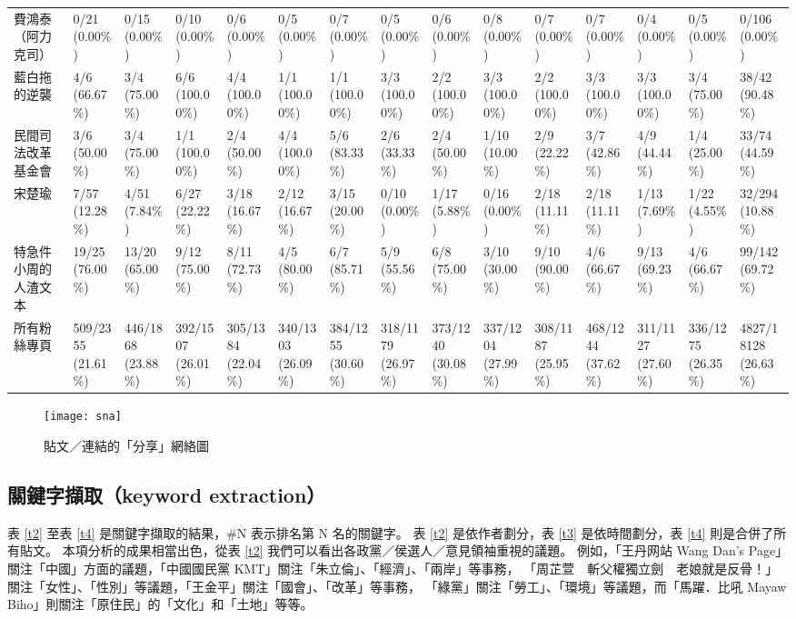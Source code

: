 \documentclass[letterpaper, 10pt, conference]{ieeeconf}   %
\begin{document}
\begin{CJK}{UTF8}{bsmi}
\begin{landscape}
\begin{longtable}[c]{@{}L{2.45cm}L{1.1cm}L{1.1cm}L{1.1cm}L{1.1cm}L{1.1cm}L{1.1cm}L{1.1cm}L{1.1cm}L{1.1cm}L{1.1cm}L{1.1cm}L{1.1cm}L{1.1cm}L{1.1cm}@{}}
費鴻泰（阿力克司） & 0/21 (0.00\%) & 0/15 (0.00\%) & 0/10 (0.00\%) & 0/6 (0.00\%) & 0/5 (0.00\%) & 0/7 (0.00\%) & 0/5 (0.00\%) & 0/6 (0.00\%) & 0/8 (0.00\%) & 0/7 (0.00\%) & 0/7 (0.00\%) & 0/4 (0.00\%) & 0/5 (0.00\%) & 0/106 (0.00\%) \\
藍白拖的逆襲 & 4/6 (66.67\%) & 3/4 (75.00\%) & 6/6 (100.00\%) & 4/4 (100.00\%) & 1/1 (100.00\%) & 1/1 (100.00\%) & 3/3 (100.00\%) & 2/2 (100.00\%) & 3/3 (100.00\%) & 2/2 (100.00\%) & 3/3 (100.00\%) & 3/3 (100.00\%) & 3/4 (75.00\%) & 38/42 (90.48\%) \\
民間司法改革基金會 & 3/6 (50.00\%) & 3/4 (75.00\%) & 1/1 (100.00\%) & 2/4 (50.00\%) & 4/4 (100.00\%) & 5/6 (83.33\%) & 2/6 (33.33\%) & 2/4 (50.00\%) & 1/10 (10.00\%) & 2/9 (22.22\%) & 3/7 (42.86\%) & 4/9 (44.44\%) & 1/4 (25.00\%) & 33/74 (44.59\%) \\
宋楚瑜 & 7/57 (12.28\%) & 4/51 (7.84\%) & 6/27 (22.22\%) & 3/18 (16.67\%) & 2/12 (16.67\%) & 3/15 (20.00\%) & 0/10 (0.00\%) & 1/17 (5.88\%) & 0/16 (0.00\%) & 2/18 (11.11\%) & 2/18 (11.11\%) & 1/13 (7.69\%) & 1/22 (4.55\%) & 32/294 (10.88\%) \\
特急件小周的人渣文本 & 19/25 (76.00\%) & 13/20 (65.00\%) & 9/12 (75.00\%) & 8/11 (72.73\%) & 4/5 (80.00\%) & 6/7 (85.71\%) & 5/9 (55.56\%) & 6/8 (75.00\%) & 3/10 (30.00\%) & 9/10 (90.00\%) & 4/6 (66.67\%) & 9/13 (69.23\%) & 4/6 (66.67\%) & 99/142 (69.72\%) \\
所有粉絲專頁 & 509/2355 (21.61\%) & 446/1868 (23.88\%) & 392/1507 (26.01\%) & 305/1384 (22.04\%) & 340/1303 (26.09\%) & 384/1255 (30.60\%) & 318/1179 (26.97\%) & 373/1240 (30.08\%) & 337/1204 (27.99\%) & 308/1187 (25.95\%) & 468/1244 (37.62\%) & 311/1127 (27.60\%) & 336/1275 (26.35\%) & 4827/18128 (26.63\%) \\* \bottomrule
\end{longtable}
\end{landscape}

\begin{figure}[!htbp]
\centering
\texttt{[image: sna]}
\caption{貼文／連結的「分享」網絡圖}
\label{f4}
\end{figure}

\twocolumn

\subsection*{關鍵字擷取（keyword extraction）}

表 \ref{t2} 至表 \ref{t4} 是關鍵字擷取的結果，\#N 表示排名第 N 名的關鍵字。%
表 \ref{t2} 是依作者劃分，表 \ref{t3} 是依時間劃分，表 \ref{t4} 則是合併了所有貼文。%
本項分析的成果相當出色，從表 \ref{t2} 我們可以看出各政黨／侯選人／意見領袖重視的議題。%
例如，「王丹网站 Wang Dan's Page」關注「中國」方面的議題，「中國國民黨 KMT」關注「朱立倫」、「經濟」、「兩岸」等事務，%
「周芷萱　斬父權獨立劍　老娘就是反骨！」關注「女性」、「性別」等議題，「王金平」關注「國會」、「改革」等事務，%
「綠黨」關注「勞工」、「環境」等議題，而「馬躍．比吼 Mayaw Biho」則關注「原住民」的「文化」和「土地」等等。%


\end{CJK}
\end{document}
